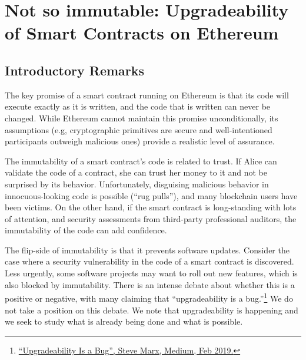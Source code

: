 \chapter{Not so immutable: Upgradeability of Smart Contracts on Ethereum} 
\label{ch:upgrade}


\section{Introductory Remarks}
The key promise of a smart contract running on Ethereum is that its code will execute exactly as it is written, and the code that is written can never be changed. While Ethereum cannot maintain this promise unconditionally, its assumptions (e.g, cryptographic primitives are secure and well-intentioned participants outweigh malicious ones) provide a realistic level of assurance. 

The immutability of a smart contract's code is related to trust. If Alice can validate the code of a contract, she can trust her money to it and not be surprised by its behavior. Unfortunately, disguising malicious behavior in innocuous-looking code is possible (``rug pulls''), and many blockchain users have been victims. On the other hand, if the smart contract is long-standing with lots of attention, and security assessments from third-party professional auditors, the immutability of the code can add confidence. 

The flip-side of immutability is that it prevents software updates. Consider the case where a security vulnerability in the code of a smart contract is discovered. Less urgently, some software projects may want to roll out new features, which is also blocked by immutability. There is an intense debate about whether this is a positive or negative, with many claiming that ``upgradeability is a bug.''\footnote{\href{https://medium.com/consensys-diligence/upgradeability-is-a-bug-dba0203152ce}{``Upgradeability Is a Bug'', Steve Marx, Medium, Feb 2019.}} We do not take a position on this debate. We note that upgradeability is happening and we seek to study what is already being done and what is possible. 

